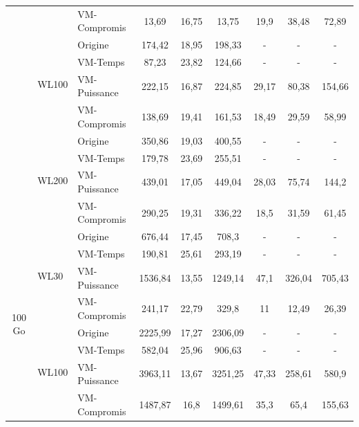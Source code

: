 \begin{table}
\begin{tabular}{cllcccccc}
    &       &     VM-Compromis    & 13,69 & 16,75 & 13,75 &  19,9  &  38,48  &    72,89      \\
    \noalign{\smallskip}
    \cline{2-9}
    \noalign{\smallskip}
    &     \multirow{4}{*}{WL100}   & Origine & 174,42 & 18,95 & 198,33 & - & - &    -      \\
 &  &     VM-Temps         & 87,23 & 23,82 & 124,66 &  -  &  -  &    -      \\
    &       &     VM-Puissance        & 222,15 & 16,87 & 224,85 &  29,17  &  80,38  &    154,66      \\
    &       &     VM-Compromis    & 138,69 & 19,41 & 161,53 &  18,49  &  29,59  &    58,99      \\
    \noalign{\smallskip}
    \cline{2-9}
    \noalign{\smallskip}
    &     \multirow{4}{*}{WL200}     & Origine & 350,86 & 19,03 & 400,55 & - & - &    -      \\
 &  &     VM-Temps         & 179,78 & 23,69 & 255,51 &  -  &  -  &    -      \\
    &       &     VM-Puissance        & 439,01 & 17,05 & 449,04 &  28,03  &  75,74  &    144,2      \\
    &       &     VM-Compromis    & 290,25 & 19,31 & 336,22 &  18,5  &  31,59  &    61,45      \\
    \midrule
\multirow{12}{*}{100 Go}     &     \multirow{4}{*}{WL30}     & Origine & 676,44 & 17,45 & 708,3 & - & - &    -      \\
 &  &     VM-Temps         & 190,81 & 25,61 & 293,19 &  -  &  -  &    -      \\
    &       &     VM-Puissance        & 1536,84 & 13,55 & 1249,14 &  47,1  &  326,04  &    705,43      \\
    &       &     VM-Compromis    & 241,17 & 22,79 & 329,8 &  11  &  12,49  &    26,39      \\
    \noalign{\smallskip}
    \cline{2-9}
    \noalign{\smallskip}
    &     \multirow{4}{*}{WL100}   & Origine & 2225,99 & 17,27 & 2306,09 & - & - &    -      \\
 &  &     VM-Temps         & 582,04 & 25,96 & 906,63 &  -  &  -  &    -      \\
    &       &     VM-Puissance        & 3963,11 & 13,67 & 3251,25 &  47,33  &  258,61  &    580,9      \\
    &       &     VM-Compromis    & 1487,87 & 16,8 & 1499,61 &  35,3  &  65,4  &    155,63      \\

\end{tabular}
\end{table}
